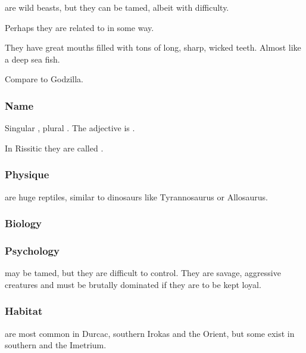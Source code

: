\Cortios{} are wild beasts, but they can be tamed, albeit with difficulty. 

Perhaps they are related to \dragons{} in some way. 

They have great mouths filled with tons of long, sharp, wicked teeth. Almost like a deep sea fish. 

Compare to Godzilla. 









\subsubsection{Name}
Singular \emph{\cortio{}}, plural \emph{\cortios{}}. 
The adjective is \emph{\cortio{}}. 

In Rissitic they are called \emph{\tashrek{}}. 









\subsubsection{Physique}
\Cortios{} are huge reptiles, similar to dinosaurs like Tyrannosaurus or Allosaurus. 









\subsubsection{Biology}








\subsubsection{Psychology}
\Cortios{} may be tamed, but they are difficult to control. They are savage, aggressive creatures and must be brutally dominated if they are to be kept loyal. 









\subsubsection{Habitat}
\Cortios{} are most common in Durcac, southern Irokas and the Orient, but some exist in southern \Velcad{} and the Imetrium. 















